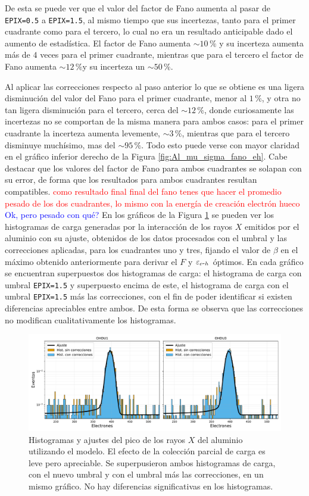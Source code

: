 De esta se puede ver que el valor del factor de Fano aumenta al pasar de \verb|EPIX=0.5| a \verb|EPIX=1.5|, al mismo tiempo que sus incertezas, tanto para el primer cuadrante como para el tercero, lo cual no era un resultado anticipable dado el aumento de estadística. El factor de Fano aumenta $\sim 10\,\%$ y su incerteza aumenta más de $4$ veces para el primer cuadrante, mientras que para el tercero el factor de Fano aumenta $\sim 12\,\%$y su incerteza un $\sim 50\,\%$.

Al aplicar las correcciones respecto al paso anterior lo que se obtiene es una ligera disminución del valor del Fano para el primer cuadrante, menor al $1\,\%$, y otra no tan ligera disminución para el tercero, cerca del $\sim 12\,\%$, donde curiosamente las incertezas no se comportan de la misma manera para ambos casos: para el primer cuadrante la incerteza aumenta levemente, $\sim 3\,\%$, mientras que para el tercero disminuye muchísimo, mas del $\sim 95\,\%$. Todo esto puede verse con mayor claridad en el gráfico inferior derecho de la Figura \ref{fig:Al_mu_sigma_fano_eh}. Cabe destacar que los valores del factor de Fano para ambos cuadrantes se solapan con su error, de forma que los resultados para ambos cuadrantes resultan compatibles.
\textcolor{red}{como resultado final final del fano tenes que hacer el promedio pesado de los dos cuadrantes, lo mismo con la energía de creación electrón hueco} \textcolor{blue}{Ok, pero pesado con qué?}
En los gráficos de la Figura \ref{fig:Al_OHDU1y3_EPIX15_Corr} se pueden ver los histogramas de carga generadas por la interacción de los rayos $X$ emitidos por el aluminio con su ajuste, obtenidos de los datos procesados con el umbral y las correcciones aplicadas, para los cuadrantes uno y tres, fijando el valor de $\beta$ en el máximo obtenido anteriormente para derivar el $F$ y $\varepsilon_{e\mbox{-}h}$ óptimos. En cada gráfico se encuentran superpuestos dos histogramas de carga: el histograma de carga con umbral \verb|EPIX=1.5| y superpuesto encima de este, el histograma de carga con el umbral \verb|EPIX=1.5| más las correcciones, con el fin de poder identificar si existen diferencias apreciables entre ambos. De esta forma se observa que las correcciones no modifican cualitativamente los histogramas.
\begin{figure}[h]
    \centering
        \includegraphics[scale=0.5]{Figs/Al_hists_ohdu1y3_dobles.pdf}
    \caption{Histogramas y ajustes del pico de los rayos $X$ del aluminio utilizando el modelo. El efecto de la colección parcial de carga es leve pero apreciable. Se superpusieron ambos histogramas de carga, con el nuevo umbral y con el umbral más las correcciones, en un mismo gráfico. No hay diferencias significativas en los histogramas.}
    \label{fig:Al_OHDU1y3_EPIX15_Corr}
\end{figure}
